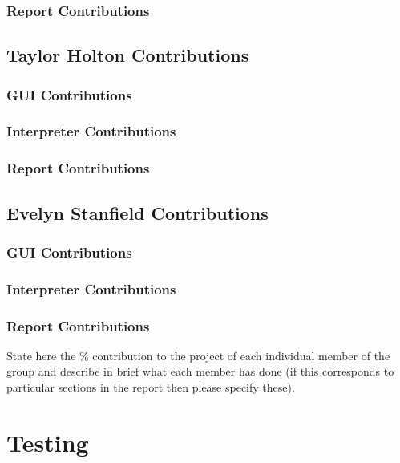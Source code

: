 \documentclass[a4paper, oneside, 11pt]{report}
\begin{document}
    \subsection{Report Contributions}

    \section{Taylor Holton Contributions}
    \subsection{GUI Contributions}
    \subsection{Interpreter Contributions}
    \subsection{Report Contributions}

    \section{Evelyn Stanfield Contributions}
    \subsection{GUI Contributions}
    \subsection{Interpreter Contributions}
    \subsection{Report Contributions}

    State here the \% contribution to the project of each individual member of the group and describe in brief what each member has done (if this corresponds to particular sections in the report then please specify these).

    \chapter{Testing}
    \label{app:test}

\end{document}
